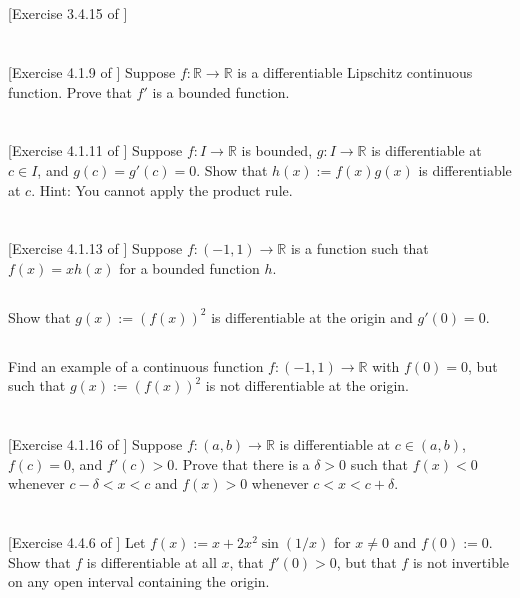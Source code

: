 \documentclass[11pt,letterpaper]{article}
\begin{document}
\section{} [Exercise 3.4.15 of \cite{Lebl_23}] 

\section{} [Exercise 4.1.9 of \cite{Lebl_23}] 
Suppose $f:\mathbb{R}\to\mathbb{R}$ is a differentiable Lipschitz continuous function. Prove that $f'$ is a bounded function.

\section{} [Exercise 4.1.11 of \cite{Lebl_23}] 
Suppose $f:I\to\mathbb{R}$ is bounded, $g:I\to\mathbb{R}$ is differentiable at $c\in I$, and $g(c)=g'(c)=0$. Show that $h(x):=f(x)g(x)$ is differentiable at $c$. Hint: You cannot apply the product rule.

\section{} [Exercise 4.1.13 of \cite{Lebl_23}] 
Suppose $f:(-1,1)\to\mathbb{R}$ is a function such that $f(x)=xh(x)$ for a bounded function $h$.

\subsection{}
Show that $g(x):=(f(x))^2$ is differentiable at the origin and $g'(0)=0$.

\subsection{}
Find an example of a continuous function $f:(-1,1)\to\mathbb{R}$ with $f(0) = 0$, but such that $g(x):= (f(x))^2$ is not differentiable at the origin.

\section{} [Exercise 4.1.16 of \cite{Lebl_23}] 
Suppose $f:(a,b)\to\mathbb{R}$ is differentiable at $c\in(a,b)$, $f(c)=0$, and $f'(c)> 0$. Prove that there is a $\delta>0$ such that $f(x)<0$ whenever $c-\delta<x<c$ and $f(x)>0$ whenever $c<x<c+\delta$.

\section{} [Exercise 4.4.6 of \cite{Lebl_23}] 
Let $f(x):= x+2x^2\sin(1/x)$ for $x\neq 0$ and $f(0):= 0$. Show that $f$ is differentiable at all $x$, that $f'(0)>0$, but that $f$ is not invertible on any open interval containing the origin.




\vfill
\printbibliography
\end{document}
